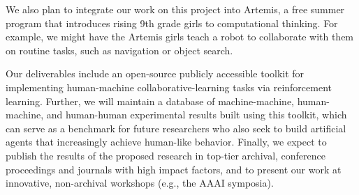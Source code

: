 We also plan to integrate our work on this project into Artemis, a
free summer program that introduces rising 9th grade girls to
computational thinking.  For example, we might have the Artemis girls
teach a robot to collaborate with them on routine tasks, such as
navigation or object search.

Our deliverables include an open-source publicly accessible toolkit
for implementing human-machine collaborative-learning tasks via
reinforcement learning. Further, we will maintain a database of
machine-machine, human-machine, and human-human experimental results
built using this toolkit, which can serve as a benchmark for future
researchers who also seek to build artificial agents that increasingly
achieve human-like behavior.
%
Finally, we expect to publish the results of the proposed research in
top-tier archival, conference proceedings and journals with high
impact factors, and to present our work at innovative, non-archival
workshops (e.g., the AAAI symposia).

